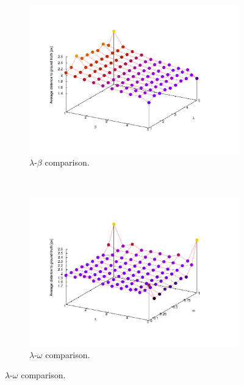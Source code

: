 \begin{figure}[t]
        \centering
        \begin{subfigure}[b]{0.33\textwidth}
                \centering
                \includegraphics[width=\textwidth, trim=80 80 150 100,clip]{fig24.pdf}
                \caption{$\lambda$-$\beta$ comparison.}
                \label{fig:cp02_err_measure_lambda_beta}
        \end{subfigure}%
        ~ %
        \begin{subfigure}[b]{0.33\textwidth}
                \centering
                \includegraphics[width=\textwidth, trim=80 80 150 100,clip]{fig25.pdf}
                \caption{$\lambda$-$\omega$ comparison.}

\end{subfigure}
\end{figure}
